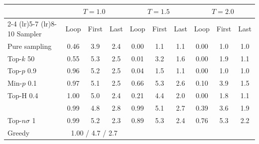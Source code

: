 \begin{tabular}{lccccccccc}
\toprule
 & \multicolumn{3}{c}{$T{=}1.0$} & \multicolumn{3}{c}{$T{=}1.5$} & \multicolumn{3}{c}{$T{=}2.0$} \\
\cmidrule(lr){2-4} \cmidrule(lr){5-7} \cmidrule(lr){8-10}
Sampler & Loop & First & Last & Loop & First & Last & Loop & First & Last \\
\midrule
Pure sampling & 0.46 & 3.9 & 2.4 & 0.00 & 1.1 & 1.1 & 0.00 & 1.0 & 1.0 \\
Top-$k$ 50 & 0.55 & 5.3 & 2.5 & 0.01 & 3.2 & 1.6 & 0.00 & 1.9 & 1.1 \\
Top-$p$ 0.9 & 0.96 & 5.2 & 2.5 & 0.04 & 1.5 & 1.1 & 0.00 & 1.0 & 1.0 \\
Min-$p$ 0.1 & 0.97 & 5.1 & 2.5 & 0.66 & 5.3 & 2.6 & 0.10 & 3.9 & 1.5 \\
Top-H 0.4 & 1.00 & 5.0 & 2.4 & 0.21 & 4.4 & 2.0 & 0.00 & 1.8 & 1.1 \\
\pless{} & 0.99 & 4.8 & 2.8 & 0.99 & 5.1 & 2.7 & 0.39 & 3.6 & 1.9 \\
Top-$n\sigma$ 1 & 0.99 & 5.2 & 2.3 & 0.89 & 5.3 & 2.4 & 0.76 & 5.3 & 2.2 \\
\midrule
Greedy & \multicolumn{3}{c}{1.00 / 4.7 / 2.7} &  &  &  &  &  &  \\
\bottomrule
\end{tabular}

